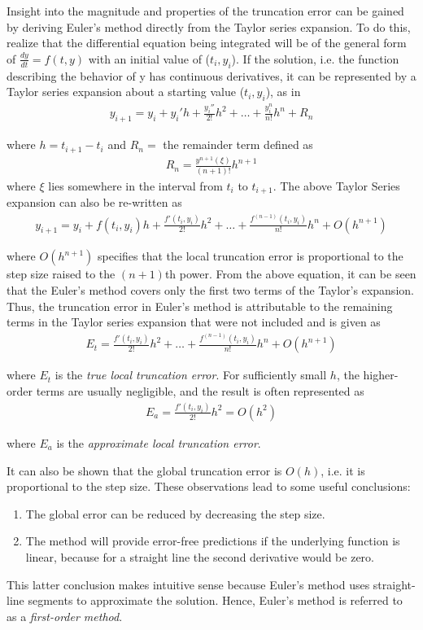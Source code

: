 \documentclass[book.tex]{subfiles}
\begin{document}
Insight into the magnitude and properties of the truncation error can be gained by deriving
Euler’s method directly from the Taylor series expansion. To do this, realize that the
differential equation being integrated will be of the general form of $\frac{dy}{dt} = f(t,y)$ with an initial value of ($t_i,y_i$). If the solution, i.e. the function describing the behavior of y has continuous derivatives, it can be represented by a Taylor series expansion about a starting value ($t_i ,y_i$), as in
\begin{align}
y_{i+1} = y_{i} + y_{i}'h + \frac{y_i''}{2!}h^2 + \dots + \frac{y_i^{n}}{n!}h^n + R_n
\end{align}

where $h = t_{i+1} - t_{i}$ and $R_n = $ the remainder term defined as
\begin{align}
R_n = \frac{y^{n+1}(\xi)}{(n+1)!}h^{n+1}
\end{align}
where $\xi$ lies somewhere in the interval from $t_i$ to $t_{i+1}$. The above Taylor Series expansion can also be re-written as
\begin{align}
y_{i+1} = y_{i} + f(t_i,y_i)h + \frac{f'(t_i,y_i)}{2!}h^2 + \dots + \frac{f^{(n-1)}(t_i,y_i)}{n!}h^n + O(h^{n+1})
\end{align}

where $O(h^{n+1})$ specifies that the local truncation error is proportional to the step size raised to the $(n + 1)$th power. From the above equation, it can be seen that the Euler's method covers only the first two terms of the Taylor's expansion. Thus, the truncation error in Euler’s method is attributable to the remaining terms in the Taylor series expansion that were not included and is given as
\begin{align}
E_t = \frac{f'(t_i,y_i)}{2!}h^2 + \dots + \frac{f^{(n-1)}(t_i,y_i)}{n!}h^n + O(h^{n+1})
\end{align}

where $E_t$ is the \textit{true local truncation error}. For sufficiently small $h$, the higher-order terms are usually negligible, and the result is often represented as 
\begin{align}
E_a = \frac{f'(t_i,y_i)}{2!}h^2 = O(h^2)
\end{align}

where $E_a$ is the \textit{approximate local truncation error}. 

It can also be shown that the global truncation error is $O(h)$, i.e. it is proportional to the step size. These observations lead to some useful conclusions:
\begin{enumerate}
	\item The global error can be reduced by decreasing the step size.
	\item The method will provide error-free predictions if the underlying function is linear, because for a straight line the second derivative would be zero.
\end{enumerate}
This latter conclusion makes intuitive sense because Euler’s method uses straight-line segments to approximate the solution. Hence, Euler’s method is referred to as a \textit{first-order method}.
\end{document}
